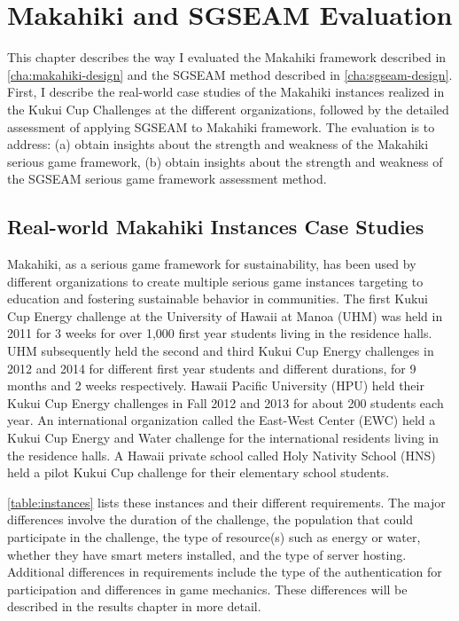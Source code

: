\chapter{Makahiki and SGSEAM Evaluation}
\label{cha:evaluation}

This chapter describes the way I evaluated the Makahiki framework described in \autoref{cha:makahiki-design} and the SGSEAM method described in \autoref{cha:sgseam-design}. First, I describe the real-world case studies of the Makahiki instances realized in the Kukui Cup Challenges at the different organizations, followed by the detailed assessment of applying SGSEAM to Makahiki framework. The evaluation is to address:
(a) obtain insights about the strength and weakness of the Makahiki serious game framework, (b) obtain insights about the strength and weakness of the  SGSEAM serious game framework assessment method.

\section{Real-world Makahiki Instances Case Studies}

Makahiki, as a serious game framework for sustainability, has been used by different organizations to create multiple serious game instances targeting to education and fostering sustainable behavior in communities. The first Kukui Cup Energy challenge at the University of Hawaii at Manoa (UHM) was held in 2011 for 3 weeks for over 1,000 first year students living in the residence halls. UHM subsequently held the second and third Kukui Cup Energy challenges in 2012 and 2014 for different first year students and different durations, for 9 months and 2 weeks respectively. Hawaii Pacific University (HPU) held their Kukui Cup Energy challenges in Fall 2012 and 2013 for about 200 students each year. An international organization called the East-West Center (EWC) held a Kukui Cup Energy and Water challenge for the international residents living in the residence halls. A Hawaii private school called Holy Nativity School (HNS) held a pilot Kukui Cup challenge for their elementary school students. 

\autoref{table:instances} lists these instances and their different requirements. The major differences involve the duration of the challenge, the population that could participate in the challenge, the type of resource(s) such as energy or water, whether they have smart meters installed, and the type of server hosting. Additional differences in requirements include the type of the authentication for participation and differences in game mechanics. These differences will be described in the results chapter in more detail.

